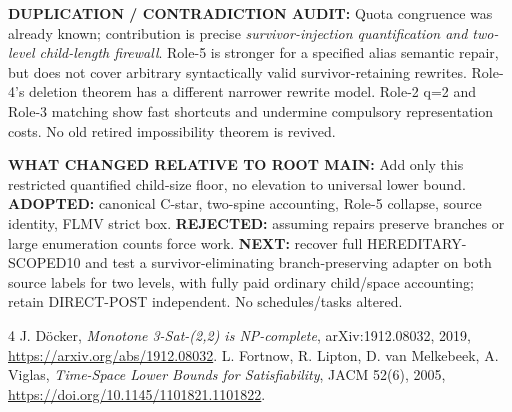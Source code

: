 \documentclass[11pt]{article}
\begin{document}
\noindent\textbf{DUPLICATION / CONTRADICTION AUDIT:} Quota congruence was already known; contribution is precise \emph{survivor-injection quantification and two-level child-length firewall}. Role-5 is stronger for a specified alias semantic repair, but does not cover arbitrary syntactically valid survivor-retaining rewrites. Role-4's deletion theorem has a different narrower rewrite model. Role-2 q=2 and Role-3 matching show fast shortcuts and undermine compulsory representation costs. No old retired impossibility theorem is revived.

\noindent\textbf{WHAT CHANGED RELATIVE TO ROOT MAIN:} Add only this restricted quantified child-size floor, no elevation to universal lower bound. \textbf{ADOPTED:} canonical C-star, two-spine accounting, Role-5 collapse, source identity, FLMV strict box. \textbf{REJECTED:} assuming repairs preserve branches or large enumeration counts force work. \textbf{NEXT:} recover full HEREDITARY-SCOPED10 and test a survivor-eliminating branch-preserving adapter on both source labels for two levels, with fully paid ordinary child/space accounting; retain DIRECT-POST independent. No schedules/tasks altered.
\begin{thebibliography}{4}
 J. D\"ocker, \emph{Monotone 3-Sat-(2,2) is NP-complete}, arXiv:1912.08032, 2019, \url{https://arxiv.org/abs/1912.08032}.
 L. Fortnow, R. Lipton, D. van Melkebeek, A. Viglas, \emph{Time-Space Lower Bounds for Satisfiability}, JACM 52(6), 2005, \url{https://doi.org/10.1145/1101821.1101822}.
\end{thebibliography}
\end{document}
